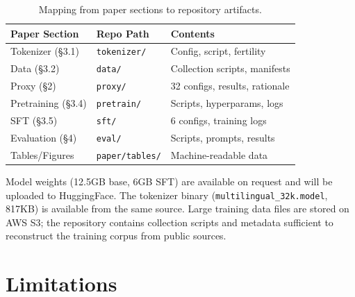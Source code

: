 \documentclass[10pt,twocolumn]{article}
\begin{document}
\begin{table}[H]
\centering\scriptsize
\begin{tabular}{lll}
\toprule
\textbf{Paper Section} & \textbf{Repo Path} & \textbf{Contents} \\
\midrule
Tokenizer (\S3.1) & \texttt{tokenizer/} & Config, script, fertility \\
Data (\S3.2) & \texttt{data/} & Collection scripts, manifests \\
Proxy (\S2) & \texttt{proxy/} & 32 configs, results, rationale \\
Pretraining (\S3.4) & \texttt{pretrain/} & Scripts, hyperparams, logs \\
SFT (\S3.5) & \texttt{sft/} & 6 configs, training logs \\
Evaluation (\S4) & \texttt{eval/} & Scripts, prompts, results \\
Tables/Figures & \texttt{paper/tables/} & Machine-readable data \\
\bottomrule
\end{tabular}
\caption{Mapping from paper sections to repository artifacts.}
\label{tab:reproducibility}
\end{table}

Model weights (12.5GB base, 6GB SFT) are available on request and will be uploaded to HuggingFace. The tokenizer binary (\texttt{multilingual\_32k.model}, 817KB) is available from the same source. Large training data files are stored on AWS S3; the repository contains collection scripts and metadata sufficient to reconstruct the training corpus from public sources.

\section{Limitations}
\label{sec:limitations}
\end{document}
